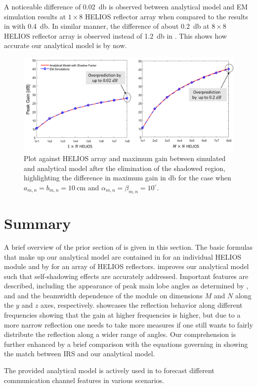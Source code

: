 A noticeable difference of \SI{0.02}{\decibel} is observed between analytical model and EM simulation results at $\num{1}\times \num{8}$ HELIOS reflector array when compared to the results in  with \SI{0.4}{\decibel}. In similar manner, the difference of about \SI{0.2}{\decibel} at $\num{8}\times \num{8}$ HELIOS reflector array is observed instead of \SI{1.2}{\decibel} in . This shows how accurate our analytical model is by now.
\begin{figure}[H]
	\centering
	\includegraphics[width=1.0\linewidth]{images/Section 3 Images/Array_max_SR}
	\caption{Plot against HELIOS array and maximum gain between simulated and analytical model after the elimination of the shadowed region, highlighting the difference in maximum gain in $\si{\decibel}$ for the case when $a_{m,n}=b_{m,n}=\SI{10}{\centi\meter}$ and $\alpha_{m,n}=\beta_{m,n}=\num{10}^\circ$.}
	\label{fig:arraymax_SR}
\end{figure}
\section{Summary}
A brief overview of the prior section of  is given in this section. The basic formulas that make up our analytical model are contained in  for an individual HELIOS module and by  for an array of HELIOS reflectors.  improves our analytical model such that self-shadowing effects are accurately addressed. Important features are described, including the appearance of peak main lobe angles as determined by , and  and the beamwidth dependence of the module on dimensions $M$ and $N$ along the $y$ and $z$ axes, respectively.  showcases the reflection behavior along different frequencies showing that the gain at higher frequencies is higher, but due to a more narrow reflection one needs to take more measures if one still wants to fairly distribute the reflection along a wider range of angles. Our comprehension is further enhanced by a brief comparison with the equations governing in  showing the match between IRS and our analytical model.

The provided analytical model is actively used in  to forecast different communication channel features in various scenarios.
